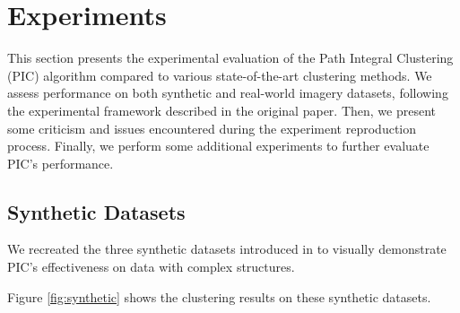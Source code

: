 \section{Experiments}
This section presents the experimental evaluation of the Path Integral Clustering (PIC) algorithm compared to various state-of-the-art clustering methods. We assess performance on both synthetic and real-world imagery datasets, following the experimental framework described in the original paper\cite{PIC}. Then, we present some criticism and issues encountered during the experiment reproduction process. Finally, we perform some additional experiments to further evaluate PIC's performance.

\subsection{Synthetic Datasets}
We recreated the three synthetic datasets introduced in \cite{PIC} to visually demonstrate PIC's effectiveness on data with complex structures.

Figure \ref{fig:synthetic} shows the clustering results on these synthetic datasets.

